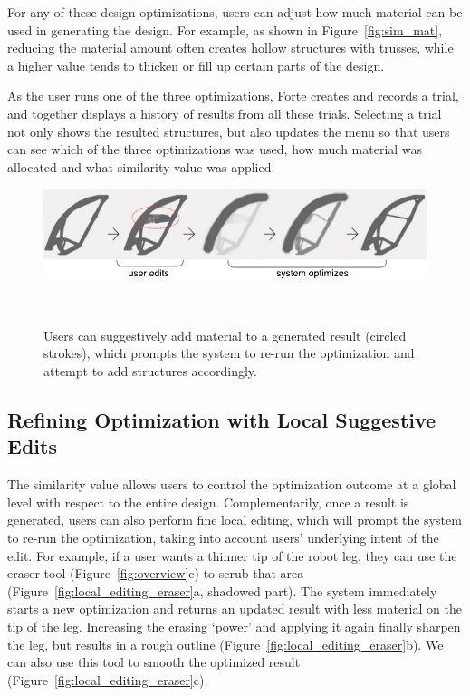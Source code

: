 For any of these design optimizations, users can adjust how much material can be used in generating the design. For example, as shown in Figure~\ref{fig:sim_mat}, reducing the material amount often creates hollow structures with trusses, while a higher value tends to thicken or fill up certain parts of the design.


As the user runs one of the three optimizations, Forte creates and records a trial, and together displays a history of results from all these trials. Selecting a trial not only shows the resulted structures, but also updates the menu so that users can see which of the three optimizations was used, how much material was allocated and what similarity value was applied.


\begin{figure} [b]
  \centering
  \includegraphics[width=0.75\columnwidth]{figures/local_editing_pencil}
  \caption{Users can suggestively add material to a generated result (circled strokes), which prompts the system to re-run the optimization and attempt to add structures accordingly.}~\label{fig:local_editing_pencil}
\end{figure}

\subsection{Refining Optimization with Local Suggestive Edits}
The similarity value allows users to control the optimization outcome at a global level with respect to the entire design. Complementarily, once a result is generated, users can also perform fine local editing, which will prompt the system to re-run the optimization, taking into account users' underlying intent of the edit. For example, if a user wants a thinner tip of the robot leg, they can use the eraser tool (Figure~\ref{fig:overview}c) to scrub that area (Figure~\ref{fig:local_editing_eraser}a, shadowed part). The system immediately starts a new optimization and returns an updated result with less material on the tip of the leg. Increasing the erasing `power' and applying it again finally sharpen the leg, but results in a rough outline (Figure~\ref{fig:local_editing_eraser}b). We can also use this tool to smooth the optimized result (Figure~\ref{fig:local_editing_eraser}c).

